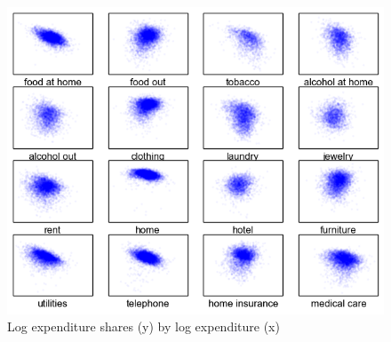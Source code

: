 \documentclass[12pt]{article}
\begin{document}
\begin{figure}
	\centering
		\includegraphics[scale=1]{pics/shr_plot.png}
	\caption{Log expenditure shares (y) by log expenditure (x)}
	\label{fig:exp_shr}
\end{figure}
\end{document}
